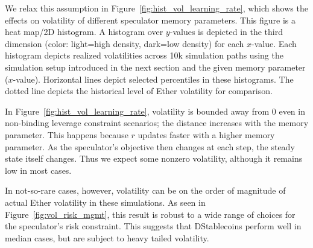 We relax this assumption in Figure~\ref{fig:hist_vol_learning_rate}, which shows the effects on volatility of different speculator memory parameters. This figure is a heat map/2D histogram. A histogram over $y$-values is depicted in the third dimension (color: light=high density, dark=low density) for each $x$-value. Each histogram depicts realized volatilities across 10k simulation paths using the simulation setup introduced in the next section and the given memory parameter ($x$-value). Horizontal lines depict selected percentiles in these histograms. The dotted line depicts the historical level of Ether volatility for comparison.

In Figure~\ref{fig:hist_vol_learning_rate}, volatility is bounded away from 0 even in non-binding leverage constraint scenarios; the distance increases with the memory parameter. This happens because $r$ updates faster with a higher memory parameter. As the speculator's objective then changes at each step, the steady state itself changes. Thus we expect some nonzero volatility, although it remains low in most cases.

In not-so-rare cases, however, volatility can be on the order of magnitude of actual Ether volatility in these simulations. As seen in Figure~\ref{fig:vol_risk_mgmt}, this result is robust to a wide range of choices for the speculator's risk constraint. This suggests that DStablecoins perform well in median cases, but are subject to heavy tailed volatility.


